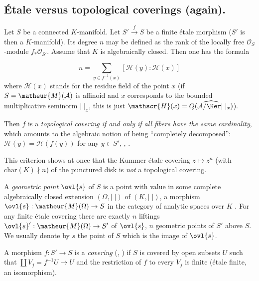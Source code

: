 \subsection{\'Etale versus topological coverings (again).}\label{sub::1.2}  

\begin{para}\label{para::1.2.1}
 Let $S$ be a connected $K$-manifold. Let $S' \xrightarrow{f} S$ be a
 finite \'etale morphism ($S'$ is then a $K$-manifold).  Its degree $n$ may be
 defined as the rank of the locally free $\mathcal{O}_S$-module
 $f_\ast\mathcal{O}_{S'}$. Assume that $K$ is algebraically closed. Then
 one has the formula 

 \begin{equation*}
  n=\sum_{y\in f^{-1}(x)}[\mathscr{H}(y):\mathscr{H}(x)]
 \end{equation*}
 where $\mathscr{H}(x)$ stands for the residue field of
 the point $x$ (if $S=\matheur{M}(\mathcal{A})$ is affinoid and
 $x$ corresponds to the bounded multiplicative seminorm $|\;|_x$, this is
 just $\mathscr{H}(x)= 
 \widehat{Q(\mathcal{A}/\Ker|\;|_x)}$).

 Then $f$ is a {\it topological covering if and only if all fibers have
 the same cardinality}, which 
 amounts to the algebraic notion of being ``completely decomposed'': $
 \mathscr{H}(y)=\mathscr{H}(f(y))$ for any $y\in S'$, 
 \cf \cite[3.2.7]{staagonf}, \cite[6.3.1]{ecfnas}.

 This criterion shows at once that the Kummer \'etale covering
 $z\mapsto z^n$ (with $\mathrm{char}(K) \nmid n$) of the 
 punctured disk is {\it not} a topological covering. 
\end{para}

\begin{para}\label{para::1.2.2}   A {\it geometric point} $\ovl{s}$ of $S$ is a
 point with value in some complete algebraically closed extension 
 $(\Omega,|\;|)$ of
 $(K,|\;|)$,  \ie a morphism ${\ovl{s}} : \matheur{M}(\Omega) \to S$ in
 the category of analytic spaces over 
 $K$ \cite[p.48]{staagonf}.  For any finite \'etale covering there are
 exactly $n$ liftings ${\ovl{s}'}:\matheur{M}(\Omega)\to S'$ of $\ovl{s}$,
 \ie $n$ geometric points of $S'$ above $S$. We usually denote by $s$ the
 point of $S$ which is the image of $\ovl{s}$.  
\end{para}

\begin{dfn}  \label{def::1.2.3}
 A morphism $f:S'\to S$ is a {\it covering} (, ) if $S$ is covered by open
 subsets $U$ such that $\coprod V_j = f^{-1}U \to U$ and the restriction 
 of $f$ to every $V_j$ is finite (\resp \'etale finite, \resp an
 isomorphism).
\end{dfn}

